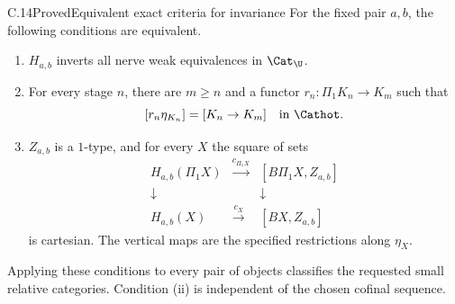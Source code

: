 \begin{claim}{C.14}{Proved}{Equivalent exact criteria for invariance}
For the fixed pair $a,b$, the following conditions are equivalent.
\begin{enumerate}[label=(\roman*)]
\item $H_{a,b}$ inverts all nerve weak equivalences in $\Cat_\U$.
\item For every stage $n$, there are $m\geq n$ and a functor $r_n:\Pi_1K_n\to K_m$ such that
\[
 [r_n\eta_{K_n}]=[K_n\to K_m]\quad\text{in }\Cathot.
\]
\item $Z_{a,b}$ is a $1$-type, and for every $X$ the square of sets
\[
 \begin{array}{ccc}
 H_{a,b}(\Pi_1X)&\xrightarrow{c_{\Pi_1X}}&[B\Pi_1X,Z_{a,b}]\\
 \downarrow&&\downarrow\\
 H_{a,b}(X)&\xrightarrow{c_X}&[BX,Z_{a,b}]
 \end{array} \tag{C.14.1}
\]
is cartesian. The vertical maps are the specified restrictions along $\eta_X$.
\end{enumerate}
Applying these conditions to every pair of objects classifies the requested small relative categories. Condition (ii) is independent of the chosen cofinal sequence.
\end{claim}
